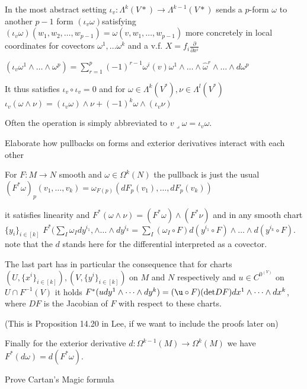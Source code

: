 In the most abstract setting \( \iota_v : \Lambda^k(V*) \to \Lambda^{k-1}(V*) \)
sends a \( p \)-form \( \omega \) to another \( p-1 \) form \( (\iota_v \omega) \)satisfying
\( (\iota_v\omega)(w_1, w_2, \dots, w_{p-1}) = \omega(v, w_1, \dots, w_{p-1})  \)
more concretely in local coordinates for covectors \( \omega^1, \dots \omega^k \) 
and a v.f. \( X = f_i \frac{\partial}{\partial x^i} \)

\( (\iota_v \omega^1 \wedge \dots \wedge \omega^p) = \sum^{p}_{r=1} (-1)^{r-1} \omega^i(v) \omega^1 \wedge \dots \wedge \hat{\omega}^r \wedge \dots \wedge d\omega^p \)

It thus satisfies
\( \iota_v \circ \iota_v = 0 \)
and for \( \omega \in \Lambda^k(V^\ast), \nu \in \Lambda^l(V^\ast)\)
\( \iota_v(\omega \wedge \nu) = (\iota_v \omega) \wedge \nu + (-1)^k \omega \wedge (\iota_v \nu) \)

Often the operation is simply abbreviated to
\( v \lrcorner \omega = \iota_v \omega \).


Elaborate how pullbacks on forms and exterior derivatives interact with each other

For \( F : M \to N \) smooth and \( \omega \in \Omega^k(N) \) the pullback 
is just the usual
\( (F^\ast \omega)_p(v_1, \dots, v_k) = \omega_{F(p)}(dF_p(v_1), \dots, dF_p(v_k)) \)

it satisfies linearity and
\( F^\ast(\omega \wedge \nu) = (F^\ast \omega) \wedge (F^\ast \nu) \)
and in any smooth chart \( \{y_i\}_{i \in [k]} \)
\( F^\ast(\sum_{I} \omega_I dy^{i_1}, \wedge \dots \wedge dy^{i_k} = \sum_{I} (\omega_I \circ F) d(y^{i_1} \circ F) \wedge \dots \wedge d(y^{i_k} \circ F) \).
note that the \( d \) stands here for the differential interpreted as a covector.

The last part has in particular the consequence that for charts \( (U, \{x^i\}_{i \in [k]}), (V, \{y^i\}_{i \in [k]}) \)
on \( M \) and \( N \) respectively and \( u \in C^{0}^(V) \) on \( U \cap F^{-1}(V) \) it holds
\( F^\ast (u dy^1 \wedge \dots \wedge dy^k) = (\u \circ F)(\text{det} DF)dx^1 \wedge \dots \wedge dx^k \),
where \( DF \) is the Jacobian of \( F \) with respect to these charts.

(This is Proposition 14.20 in Lee, if we want to include the proofs later on)

Finally for the exterior derivative \( d : \Omega^{k-1}(M) \to \Omega^{k}(M)\) we have
\( F^\ast(d\omega) = d(F^\ast\omega) \).


Prove Cartan's Magic formula

